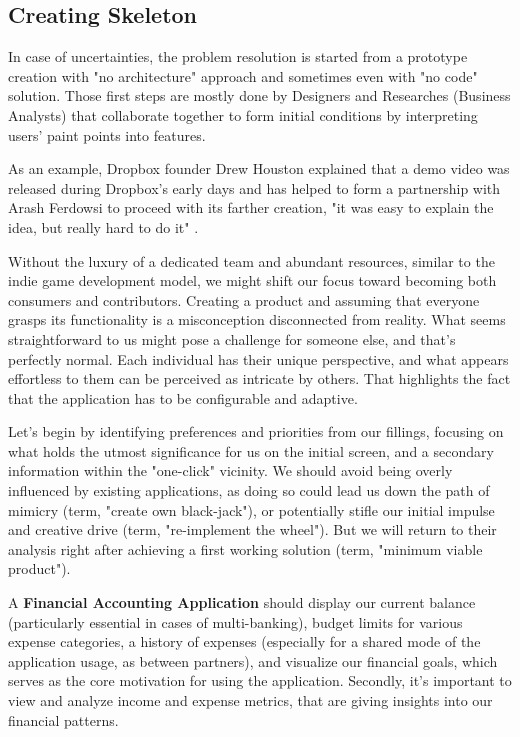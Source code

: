 
\subsection{Creating Skeleton}

In case of uncertainties, the problem resolution is started from a prototype creation with "no architecture" approach 
and sometimes even with "no code" solution. Those first steps are mostly done by Designers and Researches (Business 
Analysts) that collaborate together to form initial conditions by interpreting users' paint points into features.

As an example, Dropbox founder Drew Houston explained that a demo video was released during Dropbox's early days
and has helped to form a partnership with Arash Ferdowsi to proceed with its farther creation, "it was easy to explain 
the idea, but really hard to do it" \cite{Shon13}.

Without the luxury of a dedicated team and abundant resources, similar to the indie game development model, we might 
shift our focus toward becoming both consumers and contributors. Creating a product and assuming that everyone grasps 
its functionality is a misconception disconnected from reality. What seems straightforward to us might pose a challenge 
for someone else, and that's perfectly normal. Each individual has their unique perspective, and what appears effortless 
to them can be perceived as intricate by others. That highlights the fact that the application has to be configurable 
and adaptive.

Let's begin by identifying preferences and priorities from our fillings, focusing on what holds the utmost significance 
for us on the initial screen, and a secondary information within the "one-click" vicinity. We should avoid being overly 
influenced by existing applications, as doing so could lead us down the path of mimicry (term, "create own black-jack"), 
or potentially stifle our initial impulse and creative drive (term, "re-implement the wheel"). But we will return to 
their analysis right after achieving a first working solution (term, "minimum viable product").

A \textbf{Financial Accounting Application} should display our current balance (particularly essential in cases of 
multi-banking), budget limits for various expense categories, a history of expenses (especially for a shared mode of 
the application usage, as between partners), and visualize our financial goals, which serves as the core motivation for 
using the application. Secondly, it's important to view and analyze income and expense metrics, that are giving insights 
into our financial patterns. 

